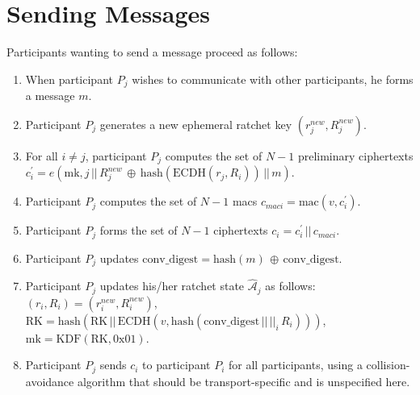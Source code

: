 \documentclass[%
preprint,
amsmath,amssymb,
aps,
prb,
floatfix,
]{revtex4-1}
\begin{document}
\section{\label{sec:sending}Sending Messages}
Participants wanting to send a message proceed as follows:
\begin{enumerate}
\item When participant $P_j$ wishes to communicate with other
participants, he forms a message $m$.
\item Participant $P_j$ generates a new ephemeral ratchet key
$(r_j^{new},R_j^{new})$.
\item For all $i \ne j$, participant $P_j$ computes the set of $N-1$ preliminary
ciphertexts $c_{i}^\prime = e(\mathrm{mk}, j
\, || \, R_j^{new} \, \oplus \, \mathrm{hash}(\mathrm{ECDH}(r_j, R_i)) \, || \, m)$.
\item Participant $P_j$ computes the set of $N-1$ macs $c_{maci} =
\mathrm{mac}(v, c_i^\prime)$.
\item Participant $P_j$ forms the set of $N-1$ ciphertexts $c_i = c_i^\prime \, || \, c_{maci}$.
\item Participant $P_j$ updates $\mathrm{conv\_digest} = \mathrm{hash}(m) \, \oplus \, \mathrm{conv\_digest}$.
\item Participant $P_j$ updates his/her ratchet state $\mathcal{\hat{A}}_j$ as
follows:\\
$(r_i, R_i) = (r_i^{new}, R_i^{new})$, \\
$\mathrm{RK} = \mathrm{hash}(\mathrm{RK} \, || \, \mathrm{ECDH}(v,
\mathrm{hash}(\mathrm{conv\_digest} \, || \, ||_i \, R_i)))$, \\
$\mathrm{mk} = \mathrm{KDF}(\mathrm{RK}, 0\mathrm{x}01)$.
\item Participant $P_j$ sends $c_i $ to participant $P_i$ for all participants,
using a collision-avoidance algorithm that should be transport-specific and is
unspecified here.
\end{enumerate}
\end{document}
